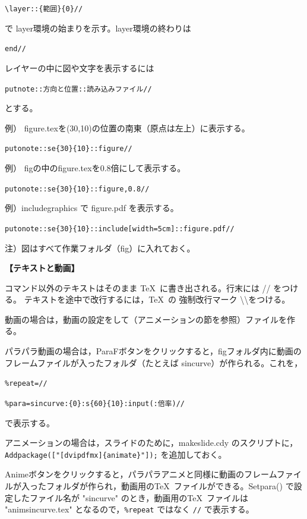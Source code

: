\documentclass[papersize,a4paper,12pt,uplatex]{jsarticle}
\begin{document}
\hspace{10mm}\verb|\layer::{範囲}{0}//|

で layer環境の始まりを示す。layer環境の終わりは 

\hspace{10mm}\verb|end//|
 
 レイヤーの中に図や文字を表示するには
 
\hspace{10mm}\verb|putnote::方向と位置::読み込みファイル//|
 
とする。
 
 例） figure.texを(30,10)の位置の南東（原点は左上）に表示する。
 
\hspace{10mm} \verb|putonote::se{30}{10}::figure//|

 例） figの中のfigure.texを0.8倍にして表示する。
 
\hspace{10mm} \verb|putonote::se{30}{10}::figure,0.8//|
 

 例）includegraphics で figure.pdf を表示する。
 
\hspace{10mm} \verb|putonote::se{30}{10}::include[width=5cm]::figure.pdf//|
 
 
 注）図はすべて作業フォルダ（fig）に入れておく。

\vspace{\baselineskip}
{\bf 【テキストと動画】}
 
コマンド以外のテキストはそのまま \TeX\ に書き出される。行末には // をつける。
テキストを途中で改行するには，\TeX\ の 強制改行マーク \textbackslash \textbackslash をつける。

動画の場合は，動画の設定をして（アニメーションの節を参照）ファイルを作る。

パラパラ動画の場合は，ParaFボタンをクリックすると，figフォルダ内に動画のフレームファイルが入ったフォルダ（たとえば sincurve）が作られる。これを，

\hspace{10mm} \verb|%repeat=//|
 
\hspace{10mm} \verb|%para=sincurve:{0}:s{60}{10}:input(:倍率)//|

で表示する。

アニメーションの場合は，スライドのために，makeslide.cdy のスクリプトに， \verb|Addpackage(["[dvipdfmx]{animate}"]);| を追加しておく。

Animeボタンをクリックすると，パラパラアニメと同様に動画のフレームファイルが入ったフォルダが作られ，動画用の\TeX\ ファイルができる。Setpara() で設定したファイル名が "sincurve" のとき，動画用の\TeX\ ファイルは "animsincurve.tex" となるので，\verb|%repeat| ではなく \verb|//| で表示する。
\end{document}
